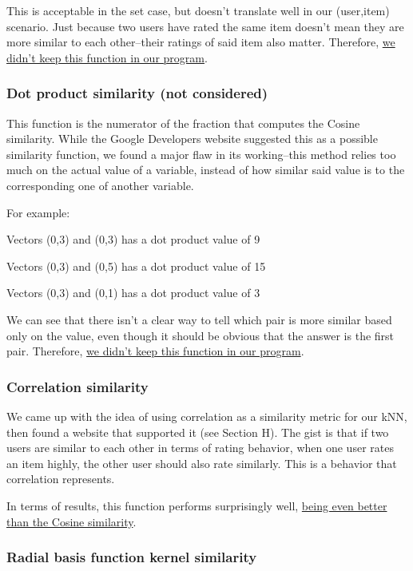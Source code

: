 \documentclass{article}
\begin{document}
This is acceptable in the set case, but doesn't translate well in our (user,item) scenario. Just because two users have rated the same item doesn't mean they are more similar to each other--their ratings of said item also matter. Therefore, \underline{we didn't keep this function in our program}.

\subsubsection{Dot product similarity (not considered)}

This function is the numerator of the fraction that computes the Cosine similarity. While the Google Developers website suggested this as a possible similarity function, we found a major flaw in its working--this method relies too much on the actual value of a variable, instead of how similar said value is to the corresponding one of another variable. 

For example:

Vectors (0,3) and (0,3) has a dot product value of 9

Vectors (0,3) and (0,5) has a dot product value of 15

Vectors (0,3) and (0,1) has a dot product value of 3

We can see that there isn't a clear way to tell which pair is more similar based only on the value, even though it should be obvious that the answer is the first pair. Therefore, \underline{we didn't keep this function in our program}.

\subsubsection{Correlation similarity}

We came up with the idea of using correlation as a similarity metric for our kNN, then found a website that supported it (see Section H). The gist is that if two users are similar to each other in terms of rating behavior, when one user rates an item highly, the other user should also rate similarly. This is a behavior that correlation represents. 

In terms of results, this function performs surprisingly well, \underline{being even better} \underline{than the Cosine similarity}.

\subsubsection{Radial basis function kernel similarity}
\end{document}
